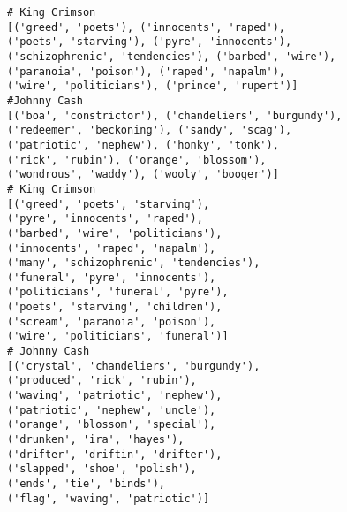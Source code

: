 \begin{listing}
	\begin{BVerbatim}
# King Crimson
[('greed', 'poets'), ('innocents', 'raped'), 
('poets', 'starving'), ('pyre', 'innocents'),
('schizophrenic', 'tendencies'), ('barbed', 'wire'),
('paranoia', 'poison'), ('raped', 'napalm'),
('wire', 'politicians'), ('prince', 'rupert')]
#Johnny Cash
[('boa', 'constrictor'), ('chandeliers', 'burgundy'),
('redeemer', 'beckoning'), ('sandy', 'scag'),
('patriotic', 'nephew'), ('honky', 'tonk'),
('rick', 'rubin'), ('orange', 'blossom'),
('wondrous', 'waddy'), ('wooly', 'booger')]
# King Crimson
[('greed', 'poets', 'starving'), 
('pyre', 'innocents', 'raped'),
('barbed', 'wire', 'politicians'), 
('innocents', 'raped', 'napalm'),
('many', 'schizophrenic', 'tendencies'),
('funeral', 'pyre', 'innocents'),
('politicians', 'funeral', 'pyre'),
('poets', 'starving', 'children'),
('scream', 'paranoia', 'poison'),
('wire', 'politicians', 'funeral')]
# Johnny Cash
[('crystal', 'chandeliers', 'burgundy'),
('produced', 'rick', 'rubin'),
('waving', 'patriotic', 'nephew'),
('patriotic', 'nephew', 'uncle'),
('orange', 'blossom', 'special'),
('drunken', 'ira', 'hayes'),
('drifter', 'driftin', 'drifter'),
('slapped', 'shoe', 'polish'),
('ends', 'tie', 'binds'), 
('flag', 'waving', 'patriotic')]
	\end{BVerbatim}
	\caption{Collocations found in bodies of work. Output of \cref{lst:colloc find}.}
	\label{lst:colloc find out}
\end{listing}

\begin{listing*}%
	\centering%
	\inputminted{python}{src/get_songs.py}
	\caption{Listing for \texttt{get\textunderscore songs}, the function to retrieve and store songs.}%
	\label{lst:get songs}%
\end{listing*}
\begin{listing*}%
	\centering%
	\inputminted{python}{src/Artist.py}
	\caption{Listing for \texttt{Artist}, the class managing the song list belonging to each artist.}%
	\label{lst:artist}%
\end{listing*}


